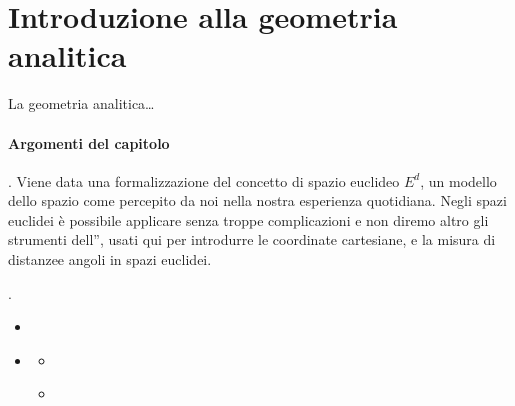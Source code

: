 \documentclass[letterpaper,10pt,italian]{jupyterBook}
\begin{document}
\chapter{Introduzione alla geometria analitica}
\label{\detokenize{ch/analytic_geometry:introduzione-alla-geometria-analitica}}\label{\detokenize{ch/analytic_geometry:geometry-analytic}}\label{\detokenize{ch/analytic_geometry::doc}}
\sphinxAtStartPar
La geometria analitica…
\subsubsection*{Argomenti del capitolo}

\sphinxAtStartPar
{\hyperref[\detokenize{ch/analytic_geometry/euclidean_space:geometry-analytic-euclidean-space}]{}}. Viene data una formalizzazione del concetto di spazio euclideo \(E^d\), un modello dello spazio come percepito da noi nella nostra esperienza quotidiana. Negli spazi euclidei è possibile applicare senza troppe complicazioni \sphinxhyphen{} e non diremo altro \sphinxhyphen{} gli strumenti dell”{\hyperref[\detokenize{ch/algebra/vector-algebra:math-hs-algebra-vector}]{}}, usati qui per introdurre le coordinate cartesiane, e la misura di distanzee angoli in spazi euclidei.

\sphinxAtStartPar
{\hyperref[\detokenize{ch/analytic_geometry/analytic_geometry_2d:geometry-analytic-2d}]{}}.
\begin{itemize}
\item {} 
\sphinxAtStartPar
{\hyperref[\detokenize{ch/analytic_geometry/analytic_geometry_2d/coordinates:geometry-analytic-2d-coordinates}]{}}

\item {} 
\sphinxAtStartPar
{\hyperref[\detokenize{ch/analytic_geometry/analytic_geometry_2d/curves:geometry-analytic-2d-curves}]{}}
\begin{itemize}
\item {} 
\sphinxAtStartPar
{\hyperref[\detokenize{ch/analytic_geometry/analytic_geometry_2d/lines:geometry-analytic-2d-lines}]{}}

\item {} 
\sphinxAtStartPar
{\hyperref[\detokenize{ch/analytic_geometry/analytic_geometry_2d/conics:geometry-analytic-2d-conics}]{}}

\end{itemize}

\end{itemize}
\end{document}

